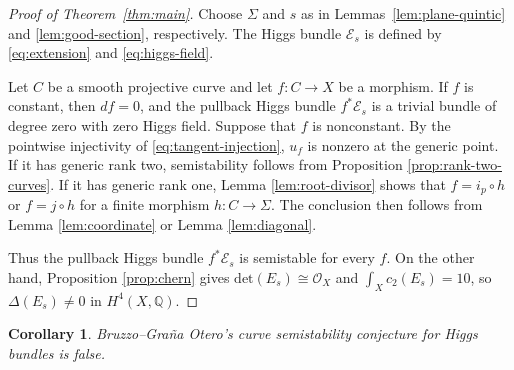 \documentclass[oneside,11pt]{amsart}
\newtheorem{cor}[thm]{Corollary}
\theoremstyle{definition}
\theoremstyle{remark}
\numberwithin{thm}{section}
\numberwithin{equation}{section}
\begin{document}
\begin{proof}[Proof of Theorem~\ref{thm:main}]
Choose $\Sigma$ and $s$ as in Lemmas~\ref{lem:plane-quintic} and
\ref{lem:good-section}, respectively.  The Higgs bundle $\mathcal{E}_s$ is defined
by \eqref{eq:extension} and \eqref{eq:higgs-field}.

Let $C$ be a smooth projective curve and let $f:C\to X$ be a
morphism.  If $f$ is constant, then $df=0$, and the pullback Higgs bundle $f^*\mathcal{E}_s$ is a trivial bundle of degree zero with zero Higgs field. Suppose that $f$ is nonconstant.  By the pointwise injectivity of \eqref{eq:tangent-injection}, $u_f$ is nonzero at the generic point.  If it has generic rank two, semistability follows from Proposition \ref{prop:rank-two-curves}.  If it has generic rank one, Lemma \ref{lem:root-divisor} shows that $f=i_p\circ h$ or $f=j\circ h$ for a finite morphism $h: C\to\Sigma$. The conclusion then follows from Lemma \ref{lem:coordinate} or Lemma \ref{lem:diagonal}.

Thus the pullback Higgs bundle $f^*\mathcal{E}_s$ is semistable for every $f$.  On the other hand, Proposition \ref{prop:chern} gives $\mathrm{det}(E_s)\cong\mathcal{O}_X$ and $\int_Xc_2(E_s)=10$, so $\Delta(E_s)\neq0$ in $H^4(X,\mathbb{Q})$.
\end{proof}

\begin{cor}\label{cor:counterexample}
Bruzzo--Gra\~na Otero's curve semistability conjecture for Higgs bundles is false.  
\end{cor}
\end{document}
